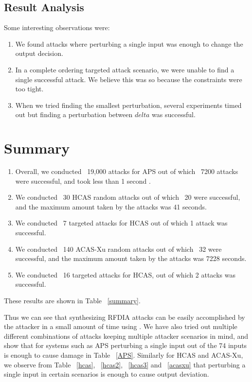 \subsection{Result Analysis}
Some interesting observations were:
\begin{enumerate}
	\item We found attacks where perturbing a single input was enough to change the output decision.  
	\item In a complete ordering targeted attack scenario, we were unable to find a single successful attack. We believe this was so because the constraints were too tight. 
	\item When we tried finding the smallest perturbation, several experiments timed out but finding a perturbation between $delta$ was successful. 
\end{enumerate}	


\section{Summary}
\begin{enumerate}
	\item Overall, we conducted ~19,000 attacks for \ac{APS} out of which ~7200 attacks were successful, and took less than 1 second . 
	\item We conducted ~30 \ac{HCAS} random attacks out of which ~20 were successful, and the maximum amount taken by the attacks was 41 seconds.
	\item We conducted ~7 targeted attacks for \ac{HCAS} out of which 1 attack was successful.
	\item We conducted ~140 \ac{ACAS-Xu} random attacks out of which ~32  were successful, and the maximum amount taken by the attacks was 7228 seconds.
	\item We conducted ~16 targeted attacks for \ac{HCAS}, out of which 2 attacks was successful.
\end{enumerate}

 
These results are shown in Table ~\ref{summary}.

Thus we can see that synthesizing \ac{RFDIA} attacks can be easily accomplished by the attacker in a small amount of time using \tool. 
We have also tried out multiple different combinations of attacks keeping multiple attacker scenarios in mind, and show that for systems such as \ac{APS} perturbing a single input out of the 74 inputs is enough to cause damage in Table ~\ref{APS}.
Similarly for \ac{HCAS} and \ac{ACAS-Xu}, we observe  from Table ~\ref{hcas}, ~\ref{hcas2}, ~\ref{hcas3} and ~\ref{acasxu} that perturbing a single input in certain scenarios is enough to cause output deviation. 

